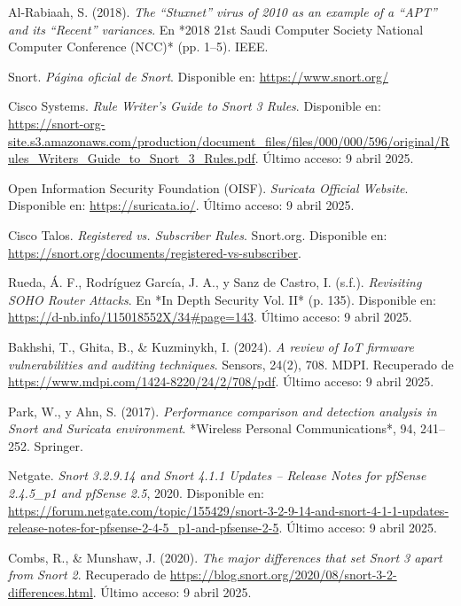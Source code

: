 \documentclass[11pt,a4paper,twoside]{report}
\begin{document}
\begin{thebibliography}{35}
	Al-Rabiaah, S. (2018). \textit{The “Stuxnet” virus of 2010 as an example of a “APT” and its “Recent” variances}. En *2018 21st Saudi Computer Society National Computer Conference (NCC)* (pp. 1--5). IEEE.
	
	Snort. \textit{Página oficial de Snort}. Disponible en: \url{https://www.snort.org/}
	
	Cisco Systems. \textit{Rule Writer’s Guide to Snort 3 Rules}. Disponible en: \url{https://snort-org-site.s3.amazonaws.com/production/document_files/files/000/000/596/original/Rules_Writers_Guide_to_Snort_3_Rules.pdf}. Último acceso: 9 abril 2025.
	
	Open Information Security Foundation (OISF). \textit{Suricata Official Website}. Disponible en: \url{https://suricata.io/}. Último acceso: 9 abril 2025.
	
	Cisco Talos. \textit{Registered vs. Subscriber Rules}. Snort.org. Disponible en: \url{https://snort.org/documents/registered-vs-subscriber}.
	
	Rueda, Á. F., Rodríguez García, J. A., y Sanz de Castro, I. (s.f.). \textit{Revisiting SOHO Router Attacks}. En *In Depth Security Vol. II* (p. 135). Disponible en: \url{https://d-nb.info/115018552X/34#page=143}. Último acceso: 9 abril 2025.
	
	Bakhshi, T., Ghita, B., \& Kuzminykh, I. (2024). \textit{A review of IoT firmware vulnerabilities and auditing techniques}. Sensors, 24(2), 708. MDPI. Recuperado de \url{https://www.mdpi.com/1424-8220/24/2/708/pdf}. Último acceso: 9 abril 2025.
	
	Park, W., y Ahn, S. (2017). \textit{Performance comparison and detection analysis in Snort and Suricata environment}. *Wireless Personal Communications*, 94, 241--252. Springer.
	
	Netgate. \textit{Snort 3.2.9.14 and Snort 4.1.1 Updates – Release Notes for pfSense 2.4.5\_p1 and pfSense 2.5}, 2020. Disponible en: \url{https://forum.netgate.com/topic/155429/snort-3-2-9-14-and-snort-4-1-1-updates-release-notes-for-pfsense-2-4-5_p1-and-pfsense-2-5}. Último acceso: 9 abril 2025.	
	
	Combs, R., \& Munshaw, J. (2020). \textit{The major differences that set Snort 3 apart from Snort 2}. Recuperado de \url{https://blog.snort.org/2020/08/snort-3-2-differences.html}. Último acceso: 9 abril 2025.
	

\end{thebibliography}
\end{document}
